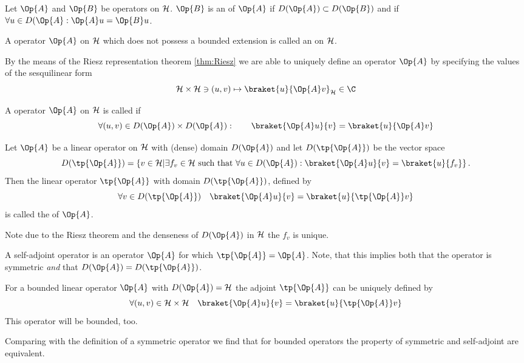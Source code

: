 \begin{defn}
	Let $\Op{A}$ and $\Op{B}$ be operators on $\mathcal{H}$.
	$\Op{B}$ is an  of $\Op{A}$ if $D(\Op{A}) \subset D(\Op{B})$
	and if $\forall u \in D(\Op{A}: \Op{A}u = \Op{B}u$.
\end{defn}

\begin{defn}
	A operator $\Op{A}$ on $\mathcal{H}$ which does not possess
	a bounded extension is called an  on $\mathcal{H}$.
\end{defn}

\begin{rem}
By the means of the Riesz representation theorem \vref{thm:Riesz}
we are able to uniquely define an operator $\Op{A}$ by
specifying the values of the sesquilinear form
\[ \hilbert \times \hilbert \ni (u, v) \mapsto \braket{u}{\Op{A} v}_\hilbert \in \C\]
\end{rem}

\begin{defn}
	A operator $\Op{A}$ on $\mathcal{H}$ is called  if
	\[ \forall (u, v) \in D(\Op{A}) \times D(\Op{A}): \qquad \braket{\Op{A} u}{v} = \braket{u}{\Op{A} v} \]
\end{defn}

\begin{defn}
	Let $\Op{A}$ be a linear operator on $\mathcal{H}$ with (dense) domain $D(\Op{A})$
	and let $D(\tp{\Op{A}})$ be the vector space
	\[ D(\tp{\Op{A}}) = \left\{ v \in \hilbert \middle|
		\exists f_v \in \hilbert \ \text{such that} \
		\forall u \in D(\Op{A}): \braket{\Op{A} u}{v} = \braket{u}{f_v} \right\}.
	\]
	Then the linear operator $\tp{\Op{A}}$ with domain $D(\tp{\Op{A}})$,
	defined by
	\[ \forall v \in D(\tp{\Op{A}}) \quad \braket{\Op{A} u}{v} = \braket{u}{\tp{\Op{A}} v} \]
	is called the \newterm{adjoint} of $\Op{A}$.
\end{defn}
Note due to the Riesz theorem and the denseness of $D(\Op{A})$ in $\mathcal{H}$
the $f_v$ is unique.

\begin{defn}
	A self-adjoint operator is an operator $\Op{A}$ for which $\tp{\Op{A}} = \Op{A}$.
	Note, that this implies both that the operator is symmetric \emph{and}
	that $D(\Op{A}) = D(\tp{\Op{A}})$.
\end{defn}

\begin{rem}
	For a bounded linear operator $\Op{A}$ with $D(\Op{A}) = \hilbert$
	the adjoint $\tp{\Op{A}}$ can be uniquely defined by
	\[ \forall (u,v) \in \hilbert \times \hilbert \quad \braket{\Op{A} u}{v} = \braket{u}{\tp{\Op{A}} v} \]
	This operator will be bounded, too.

	Comparing with the definition of a symmetric operator we find that for
	bounded operators the property of symmetric and self-adjoint are equivalent.
\end{rem}

